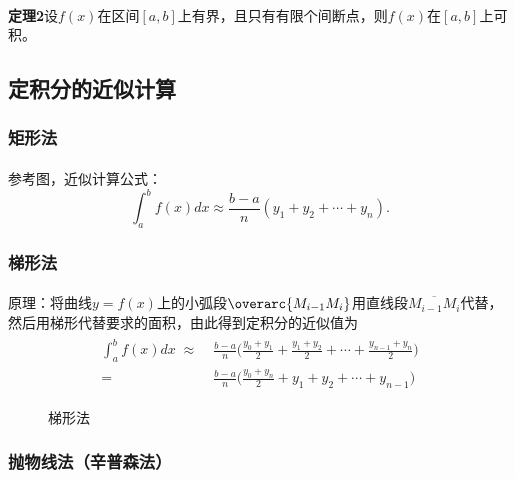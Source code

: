 \paragraph{}
\textbf{定理2\;}设$f(x)$在区间$[a,b]$上有界，且只有有限个间断点，则$f(x)$在$[a,b]$上可积。

\subsection{定积分的近似计算}
\subsubsection{矩形法}
\paragraph{}
参考图，近似计算公式：
\begin{equation}
  \int_a^bf(x)dx \approx \frac{b-a}{n}(y_1+y_2+\cdots+y_n).
\end{equation}

\subsubsection{梯形法}
\paragraph{}
原理：将曲线$y=f(x)$上的小弧段$\overarc{M_{i-1}M_i}$用直线段$\overline{M_{i-1}M_i}$代替，然后用梯形代替要求的面积，由此得到定积分的近似值为
\begin{align}
\begin{split}
  \int_a^bf(x)dx \;\approx&\; \frac{b-a}{n}\big(\frac{y_0+y_1}{2} + \frac{y_1+y_2}{2} + \cdots + \frac{y_{n-1}+y_n}{2}\big) \\
  =&\; \frac{b-a}{n}\big(\frac{y_0+y_n}{2}+y_1 + y_2 + \cdots + y_{n-1}\big)
\end{split}
\end{align}

\begin{figure}[H]
\centering
  
  \caption{梯形法}
  \label{梯形法}
\end{figure}

\subsubsection{抛物线法（辛普森法）}
